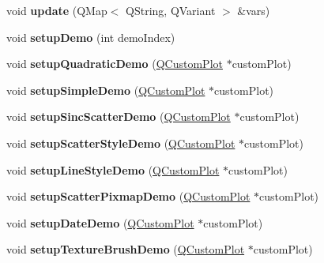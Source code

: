 \begin{DoxyCompactItemize}
void {\bfseries update} (Q\+Map$<$ Q\+String, Q\+Variant $>$ \&vars)
\item 
\mbox{\label{classruntime_window_acc4157ed488dd79f9f83c21b8643c7cf}} 
void {\bfseries setup\+Demo} (int demo\+Index)
\item 
\mbox{\label{classruntime_window_af440db9bb52ba6bf7df5419b8634423d}} 
void {\bfseries setup\+Quadratic\+Demo} (\hyperlink{class_q_custom_plot}{Q\+Custom\+Plot} $\ast$custom\+Plot)
\item 
\mbox{\label{classruntime_window_ae1e33db74b03f1cd4ca95f02448ac9f3}} 
void {\bfseries setup\+Simple\+Demo} (\hyperlink{class_q_custom_plot}{Q\+Custom\+Plot} $\ast$custom\+Plot)
\item 
\mbox{\label{classruntime_window_a22d46b29de547b5043661a63162ef2fa}} 
void {\bfseries setup\+Sinc\+Scatter\+Demo} (\hyperlink{class_q_custom_plot}{Q\+Custom\+Plot} $\ast$custom\+Plot)
\item 
\mbox{\label{classruntime_window_a8bbd53ad86707cb55a8bdbf80e17f25b}} 
void {\bfseries setup\+Scatter\+Style\+Demo} (\hyperlink{class_q_custom_plot}{Q\+Custom\+Plot} $\ast$custom\+Plot)
\item 
\mbox{\label{classruntime_window_a4a5c1b6d03e43e01da592de7cba1b2cc}} 
void {\bfseries setup\+Line\+Style\+Demo} (\hyperlink{class_q_custom_plot}{Q\+Custom\+Plot} $\ast$custom\+Plot)
\item 
\mbox{\label{classruntime_window_aa8e1791382cecfad03dbd087d626a0ae}} 
void {\bfseries setup\+Scatter\+Pixmap\+Demo} (\hyperlink{class_q_custom_plot}{Q\+Custom\+Plot} $\ast$custom\+Plot)
\item 
\mbox{\label{classruntime_window_ad085867373dcfb622d6019945bfa1d4e}} 
void {\bfseries setup\+Date\+Demo} (\hyperlink{class_q_custom_plot}{Q\+Custom\+Plot} $\ast$custom\+Plot)
\item 
\mbox{\label{classruntime_window_aa8f74d0e52e52039ab0f2ee9bb3f8e3e}} 
void {\bfseries setup\+Texture\+Brush\+Demo} (\hyperlink{class_q_custom_plot}{Q\+Custom\+Plot} $\ast$custom\+Plot)

\end{DoxyCompactItemize}
